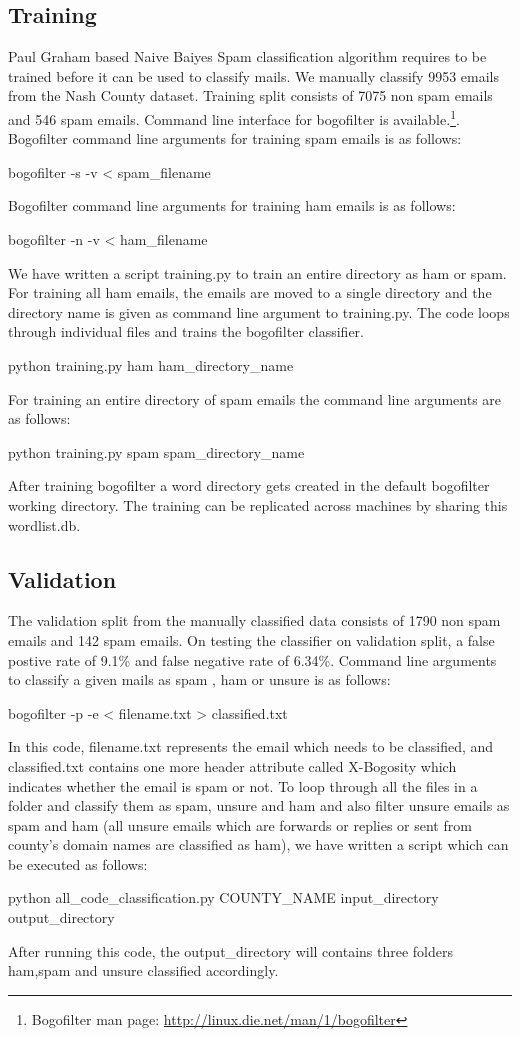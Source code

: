 \documentclass[fleqn]{MJDArticle}
\begin{document}
\subsection{Training}
Paul Graham based Naive Baiyes Spam classification algorithm requires to be trained before it can be used to classify mails. We manually classify 9953 emails from the Nash County dataset. Training split consists of 7075 non spam emails and 546 spam emails. Command line interface for bogofilter is available.\footnote{Bogofilter man page: \href{http://linux.die.net/man/1/bogofilter}{http://linux.die.net/man/1/bogofilter}}. Bogofilter command line arguments for training spam emails is as follows:
\begin{code}
bogofilter -s -v < spam_filename
\end{code}
Bogofilter command line arguments for training ham emails is as follows:
\begin{code}
bogofilter -n -v < ham_filename
\end{code}
We have written a script training.py to train an entire directory as ham or spam. For training all ham emails, the emails are moved to a single directory and the directory name is given as command line argument to training.py. The code loops through individual files and trains the bogofilter classifier.
\begin{code}
python training.py ham ham_directory_name
\end{code}
For training an entire directory of spam emails the command line arguments are as follows:
\begin{code}
python training.py spam spam_directory_name
\end{code}
After training bogofilter a word directory gets created in the default bogofilter working directory. The training can be replicated across machines by sharing this wordlist.db. 
\subsection{Validation}
The validation split from the manually classified data consists of 1790 non spam emails and 142 spam emails.
On testing the classifier on validation split, a false postive rate of 9.1\% and false negative rate of 6.34\%. 
Command line arguments to classify a given mails as spam , ham or unsure is as follows:
\begin{code}
bogofilter -p -e < filename.txt > classified.txt
\end{code}
In this code, filename.txt represents the email which needs to be classified, and classified.txt contains one more header attribute called X-Bogosity which indicates whether the email is spam or not.
To loop through all the files in a folder and classify them as spam, unsure and ham and also filter unsure emails as spam and ham (all unsure emails which are forwards or replies or sent from county's domain names are classified as ham), we have written a script which can be executed as follows:
\begin{code}
python all_code_classification.py COUNTY_NAME input_directory output_directory
\end{code}
After running this code, the output\_directory will contains three folders ham,spam and unsure classified accordingly.
\end{document}
